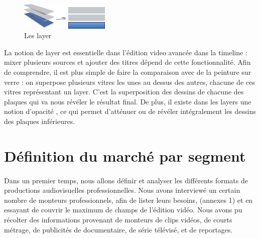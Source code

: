 \begin{figure}

  \begin{center}

    \vspace{-20pt} \includegraphics[width=0.38\textwidth]{images/layers}

  \end{center} \vspace{-20pt} \caption{Les layer} \label{Yes}

\end{figure}

La notion de layer est essentielle dans l'édition video avancée dans
la timeline : mixer plusieurs sources et ajouter des titres dépend de
cette fonctionnalité. Afin de comprendre, il est plus simple de faire
la comparaison avec de la peinture sur verre : on superpose plusieurs
vitres les unes au dessus des autres, chacune de ces vitres représentant
un layer. C'est la superposition des dessins de chacune des plaques
qui va nous révéler le résultat final. De plus, il existe dans les
layers une notion d'opacité , ce qui permet d'atténuer ou de révéler
intégralement les dessins des plaques inférieures.  \newpage

\section{Définition du marché par segment}

\paragraph{}

Dans un premier temps, nous allons définir et analyser les différents
formats de productions audiovisuelles professionnelles. Nous avons
interviewé un certain nombre de monteurs professionnels, afin de lister
leurs besoins, (annexes 1) et en essayant de couvrir le maximum de champs
de l'édition vidéo. Nous avons pu récolter des informations provenant
de monteurs de clips vidéos, de courts métrage, de publicités de
documentaire, de série télévisé, et de reportages.

\paragraph{}

